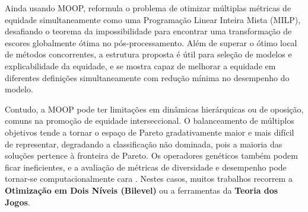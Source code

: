 Ainda usando MOOP, \citet{hsu2022pushing} reformula o problema de otimizar múltiplas métricas de equidade simultaneamente como uma Programação Linear Inteira Mista (MILP), desafiando o teorema da impossibilidade para encontrar uma transformação de escores globalmente ótima no pós-processamento. Além de superar o ótimo local de métodos concorrentes, a estrutura proposta é útil para seleção de modelos e explicabilidade da equidade, e se mostra capaz de melhorar a equidade em diferentes definições simultaneamente  com redução mínima no desempenho do modelo.

Contudo, a MOOP pode ter limitações em dinâmicas hierárquicas ou de oposição, comuns na promoção de equidade interseccional. O balanceamento de múltiplos  objetivos tende a tornar o espaço de Pareto gradativamente maior e mais difícil de representar, degradando a classificação não dominada, pois a maioria das soluções pertence à fronteira de Pareto. Os operadores genéticos também podem ficar ineficientes, e a avaliação de métricas de diversidade e desempenho pode tornar-se computacionalmente cara \cite{wagner2007pareto}. Nestes casos, muitos trabalhos recorrem a \textbf{Otimização em Dois Níveis (Bilevel)} ou a ferramentas da \textbf{Teoria dos Jogos}.

